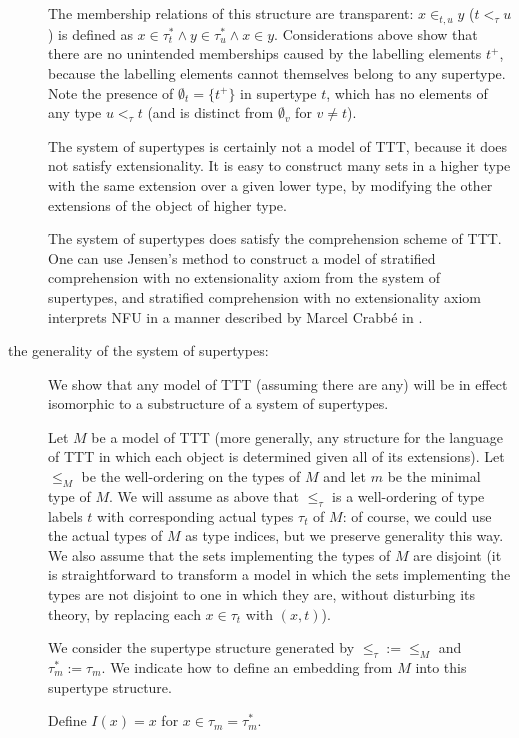\documentclass[112pt]{article}
\begin{document}
\begin{description}
The membership relations of this structure are transparent:  $x \in_{t,u} y$ ($t <_\tau u$) is defined as
$x \in \tau^*_t \wedge y \in \tau^*_u \wedge x \in y$.   Considerations above show that there are no unintended memberships caused by the labelling elements $t^+$, because the labelling elements cannot themselves belong to any supertype.  Note the presence of $\emptyset_t = \{t^+\}$ in supertype $t$, which has no elements of any type $u <_\tau t$ (and is distinct from $\emptyset_v$ for $v \neq t$).

The system of supertypes is certainly not a model of TTT, because it does not satisfy extensionality.  It is easy to construct
many sets in a higher type with the same extension over a given lower type, by modifying the other extensions of the object of higher type.

The system of supertypes does satisfy the comprehension scheme of TTT.  One can use Jensen's method to construct a model of stratified comprehension with no extensionality axiom from the system of supertypes, and stratified comprehension with no extensionality axiom interprets NFU in a manner described by Marcel Crabb\'e in \cite{marcelsf}.

\item[the generality of the system of supertypes:]  We show that any model of TTT (assuming there are any) will be in effect isomorphic to a substructure of a system of supertypes.

Let $M$ be a model of TTT (more generally, any structure for the language of TTT in which each object is determined given all of its extensions).  Let $\leq_M$ be the well-ordering on the types of $M$ and let $m$ be the minimal type of $M$.  We will assume as above that $\leq_\tau$ is a well-ordering of type labels $t$ with corresponding actual types $\tau_t$ of $M$:  of course, we could use the actual types of $M$ as type indices, but we preserve generality this way.    We also assume that the sets implementing the types of $M$ are disjoint (it is straightforward to transform a model in which the sets implementing the types are not disjoint to one in which they are, without disturbing its theory, by replacing each $x \in \tau_t$ with $(x,t)$).

We consider the supertype structure generated by $\leq_\tau:=\leq_M$ and $\tau^*_m := \tau_m$.  We indicate how to define an embedding from $M$ into this supertype structure.

Define $I(x) = x$ for $x \in \tau_m = \tau^*_m$.


\end{description}
\end{document}
